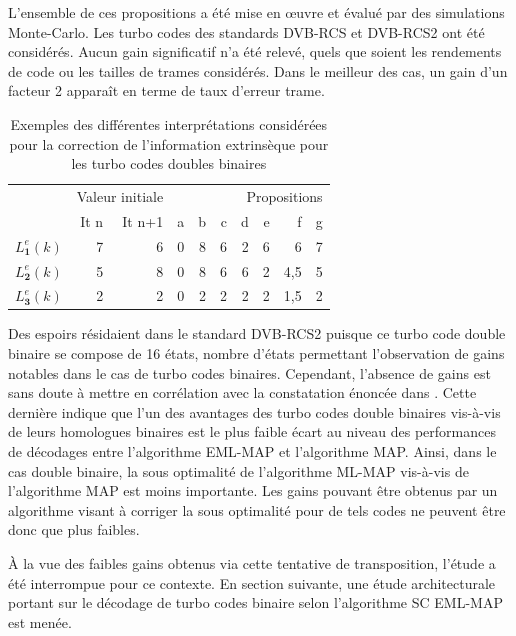 L'ensemble de ces propositions a été mise en œuvre et évalué par des simulations Monte-Carlo. Les turbo codes des standards 
DVB-RCS et DVB-RCS2 ont été considérés. Aucun gain significatif n'a été relevé, quels que soient les rendements de code ou les tailles de 
trames considérés. Dans le meilleur des cas, un gain d'un facteur 2 apparaît en terme de taux d'erreur trame. 

\begin{table}[t]
	\centering
	\begin{tabular}{lrrrrrrrrr}
		\toprule
			&\multicolumn{2}{l}{Valeur initiale} & \multicolumn{7}{r}{Propositions} \\
			\cmidrule(r){2-3} \cmidrule(r){4-10} 
		   & It n & It n+1 & a & b & c & d &e &f &g\\ 
		 \cmidrule(r){2-2} \cmidrule(r){3-3} \cmidrule(l){4-10} 
		$L^e_\mathbf{1}(k)$& 7 & 6 & 0 & 8 & 6 & 2 & 6 & 6  & 7 \\
		$L^e_\mathbf{2}(k)$& 5 & 8 & 0 & 8 & 6 & 6 & 2 & 4,5 & 5 \\
		$L^e_\mathbf{3}(k)$& 2 & 2 & 0 & 2 & 2 & 2 & 2 & 1,5 & 2 \\
		\bottomrule
	\end{tabular}
	\caption{Exemples des différentes interprétations considérées pour la correction de l'information extrinsèque pour les turbo codes doubles binaires}
	\label{tab:exsc}
\end{table}

Des espoirs résidaient dans le standard DVB-RCS2 puisque ce turbo code double binaire se compose de 16 états, nombre 
d'états permettant l'observation de gains notables dans le cas de turbo codes binaires. Cependant, l'absence de gains 
est sans doute à mettre en corrélation avec la constatation énoncée dans \cite{doublebinadvantages}. Cette dernière
indique que l'un des avantages des turbo codes double binaires vis-à-vis de leurs homologues binaires est le plus faible 
écart au niveau des performances de décodages entre l’algorithme EML-MAP et l'algorithme MAP. Ainsi, dans le cas double 
binaire, la sous optimalité de l'algorithme ML-MAP vis-à-vis de l'algorithme MAP 
est moins importante. Les gains pouvant être obtenus par un algorithme visant à corriger la sous optimalité pour de tels 
codes ne peuvent être donc que plus faibles.

À la vue des faibles gains obtenus via cette tentative de transposition, l'étude a été interrompue
pour ce contexte. En section suivante, une étude architecturale portant sur le décodage de turbo codes binaire selon 
l'algorithme SC EML-MAP est menée.

